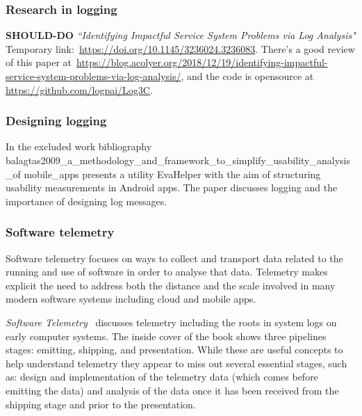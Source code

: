 \subsubsection{Research in logging}
\textbf{SHOULD-DO} \emph{``Identifying Impactful Service System Problems via Log Analysis"} Temporary link:~\url{https://doi.org/10.1145/3236024.3236083}. There's a good review of this paper at~\url{https://blog.acolyer.org/2018/12/19/identifying-impactful-service-system-problems-via-log-analysis/}, and the code is opensource at \url{https://github.com/logpai/Log3C}.


\subsubsection{Designing logging}
In the excluded work bibliography {balagtas2009_a_methodology_and_framework_to_simplify_usability_analysis_of mobile_apps} presents a utility EvaHelper with the aim of structuring usability measurements in Android apps. The paper discusses logging and the importance of designing log messages.

\subsubsection{Software telemetry}
Software telemetry focuses on ways to collect and transport data related to the running and use of software in order to analyse that data. Telemetry makes explicit the need to address both the distance and the scale involved in many modern software systems including cloud and mobile apps.

\emph{Software Telemetry}~\cite{riedesel2021_software_telemetry} discusses telemetry including the roots in system logs on early computer systems. The inside cover of the book shows three pipelines stages: emitting, shipping, and presentation. While these are useful concepts to help understand telemetry they appear to miss out several essential stages, such as: design and implementation of the telemetry data (which comes before emitting the data) and analysis of the data once it has been received from the shipping stage and prior to the presentation. 

